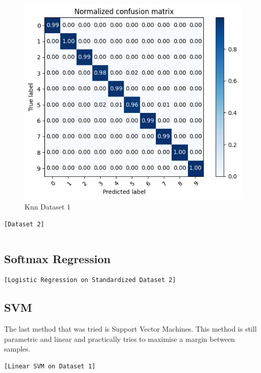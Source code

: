 \documentclass[12pt,a4paper,oneside]{article}
\begin{document}
\begin{figure}[H]
    \includegraphics{figures/knn_plain_cm.png}
    \caption{Knn Dataset 1}
\end{figure}

\begin{verbatim}[Dataset 2]
\end{verbatim}

\begin{verbatim}
\end{verbatim}

\subsection{Softmax Regression}

\begin{verbatim}[Logistic Regression on Standardized Dataset 2]
\end{verbatim}

\subsection{SVM}

The last method that was tried is Support Vector Machines. This method is still
parametric and linear and practically tries to maximise a margin between
samples. 

\begin{verbatim}[Linear SVM on Dataset 1]
\end{verbatim}
\end{document}
